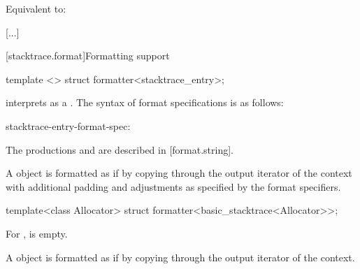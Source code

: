 \documentclass{wg21}
\begin{document}
\begin{itemdescr}
    \pnum
    \effects
    Equivalent to: 
\end{itemdescr}

\textcolor{noteclr}{[...]}

\begin{addedblock}

[stacktrace.format]{Formatting support}

\begin{itemdecl}
template <> struct formatter<stacktrace_entry>;
\end{itemdecl}

\begin{itemdescr}


 interprets  as a . The syntax of format specifications is as follows:

\begin{bnf}
    stacktrace-entry-format-spec:\br
     	
\end{bnf}

\begin{note}
    The productions  and  are described in [format.string].
\end{note}

A  object   is formatted as if by copying  through the output iterator of the context with additional padding and adjustments as specified by the format specifiers.

\end{itemdescr}




\begin{itemdecl}
template<class Allocator> struct formatter<basic_stacktrace<Allocator>>;
\end{itemdecl}

\begin{itemdescr}
For ,  is empty.

A  object  is formatted as if by copying  through the output iterator of the context.
\end{itemdescr}

\end{addedblock}
\end{document}
